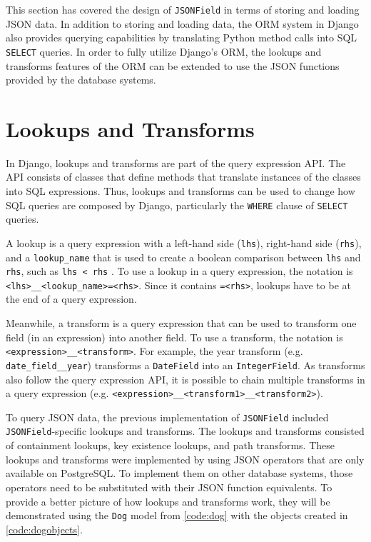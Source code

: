 This section has covered the design of \verb|JSONField| in terms of storing and
loading JSON data. In addition to storing and loading data, the ORM system in
Django also provides querying capabilities by translating Python method calls
into SQL \verb|SELECT| queries. In order to fully utilize Django's ORM, the
lookups and transforms features of the ORM can be extended to use the JSON
functions provided by the database systems.

\section{ Lookups and Transforms}

In Django, lookups and transforms are part of the query expression API. The
API consists of classes that define methods that translate instances of the
classes into SQL expressions. Thus, lookups and transforms can be used to
change how SQL queries are composed by Django, particularly the \verb|WHERE|
clause of \verb|SELECT| queries.

A lookup is a query expression with a left-hand side (\verb|lhs|), right-hand
side (\verb|rhs|), and a \verb|lookup_name| that is used to create a boolean
comparison between \verb|lhs| and \verb|rhs|, such as \verb|lhs < rhs|
\cite{django:lookups}. To use a lookup in a query expression, the notation is
\verb|<lhs>__<lookup_name>=<rhs>|. Since it contains \verb|=<rhs>|, lookups
have to be at the end of a query expression.

Meanwhile, a transform is a query expression that can be used to transform one
field (in an expression) into another field. To use a transform, the notation
is \verb|<expression>__<transform>|. For example, the year transform (e.g.
\verb|date_field__year|) transforms a \verb|DateField| into an
\verb|IntegerField|. As transforms also follow the query expression API, it is
possible to chain multiple transforms in a query expression (e.g.
\verb|<expression>__<transform1>__<transform2>|).

To query JSON data, the previous implementation of \verb|JSONField| included
\verb|JSONField|-specific lookups and transforms. The lookups and transforms
consisted of containment lookups, key existence lookups, and path transforms.
These lookups and transforms were implemented by using JSON operators that are
only available on PostgreSQL. To implement them on other database systems,
those operators need to be substituted with their JSON function equivalents. To
provide a better picture of how lookups and transforms work, they will be
demonstrated using the \verb|Dog| model from \autoref{code:dog} with the
objects created in
\autoref{code:dogobjects}.


